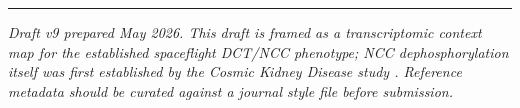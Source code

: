 \documentclass[11pt]{article}
\begin{document}
\vspace{1em}
\begin{center}
\rule{0.4\textwidth}{0.4pt}
\end{center}
\vspace{0.3em}
\noindent\textit{Draft v9 prepared May 2026. This draft is framed as a transcriptomic context map for the established spaceflight DCT/NCC phenotype; NCC dephosphorylation itself was first established by the Cosmic Kidney Disease study \citep{siew2024cosmic}. Reference metadata should be curated against a journal style file before submission.}
\end{document}
